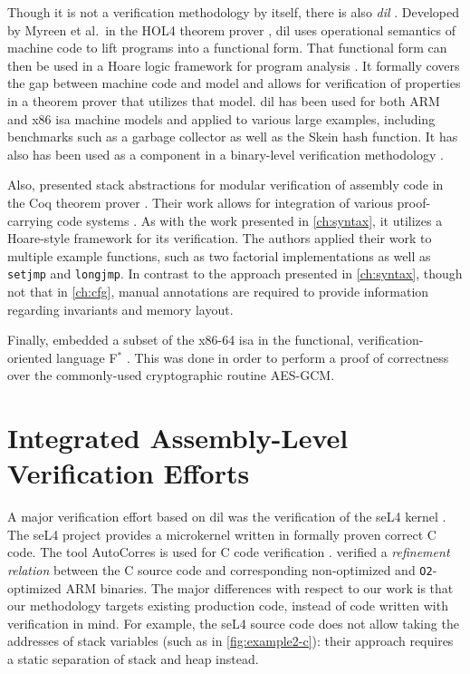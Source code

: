 Though it is not a verification methodology by itself,
there is also \emph{\ac{dil}} \autocite{myreen2008decompilation,myreen2012decompilation}.
Developed by Myreen et al.\ in the HOL4 theorem prover \autocite{slind2008brief},
\ac{dil} uses operational semantics of machine code
to lift programs into a functional form.
That functional form can then be used in a Hoare logic framework
for program analysis \autocite{myreen2007hoare}.
It formally covers the gap between machine code and  model
and allows for verification of properties in a theorem prover that utilizes that model.
\Ac{dil} has been used for both ARM and x86 \ac{isa} machine models
and applied to various large examples,
including benchmarks such as a garbage collector as well as the Skein hash function.
It has also has been used as a component in a binary-level verification methodology \autocite{sewell2013tvv}.

Also, \textcite{feng2006modular,feng2005sbca} presented stack abstractions
for modular verification of assembly code
in the Coq theorem prover \autocite{chlipala2013certified}.
Their work allows for integration
of various proof-carrying code systems \autocite{necula1997proof}.
As with the work presented in \cref{ch:syntax},
it utilizes a Hoare-style framework for its verification.
The authors applied their work to multiple example functions,
such as two factorial implementations
as well as \lstinline[style=C]|setjmp| and \lstinline[style=C]|longjmp|.
In contrast to the approach presented in \cref{ch:syntax},
though not that in \cref{ch:cfg},
manual annotations are required to provide information
regarding invariants and memory layout.

Finally, \textcite{fromherz2019verified} embedded a subset
of the x86-64 \ac{isa} in the functional, verification-oriented language
F$^*$ \autocite{fstar}.
This was done in order to perform a proof of correctness
over the commonly-used cryptographic routine AES-GCM.

\section{Integrated Assembly-Level Verification Efforts}\label{se:integrated_assembly}
A major verification effort based on \acl{dil}
was the verification of the seL4 kernel \autocite{klein2009sel4,Klein_AEMSKH_14}.
The seL4 project provides a microkernel written in formally proven correct C code.
The tool AutoCorres is used for C code verification \autocite{greenaway2012bridging}.
\textcite{sewell2013tvv} verified a \emph{refinement relation} between the C source code
and corresponding non-optimized and \lstinline|O2|-optimized ARM binaries.
The major differences with respect to our work
is that our methodology targets existing production code,
instead of code written with verification in mind.
For example, the seL4 source code does not allow taking the addresses of stack variables
(such as in \cref{fig:example2-c}):
their approach requires a static separation of stack and heap instead.

